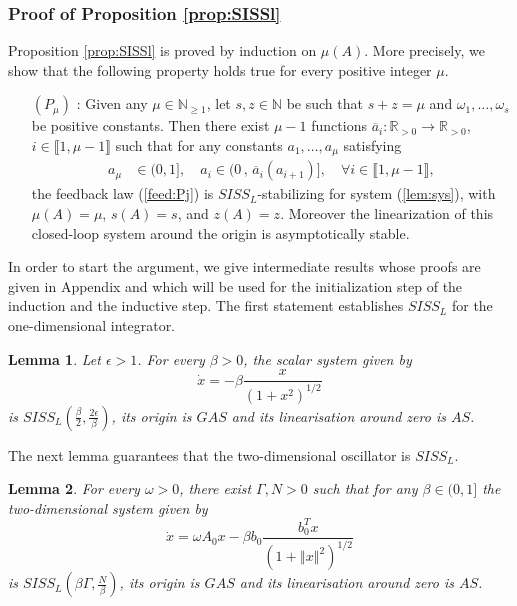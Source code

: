 \documentclass[letterpaper, 10pt]{article}
\newtheorem{lem}{Lemma}
\newcommand{\rref}[1]{(\ref{#1})}
\newcommand{\norme}[1]{\left\Vert #1\right\Vert}
\newcommand{\reels}{\mathbb{R}}
\newcommand{\entiers}{\mathbb{N}}
\begin{document}
\subsubsection{Proof of Proposition \ref{prop:SISSl}}\label{sec:proofprop1}
Proposition \ref{prop:SISSl} is proved by induction on $\mu(A)$. More precisely, we show that the following property holds true for every positive integer $\mu$.
\begin{itemize}
\item[$(P_\mu)$ : ] Given any $\mu \in \entiers_{\geq 1}$, let $s,z \in \entiers $ be such that $s + z = \mu $ and $\omega_1, \ldots , \omega_s$ be positive constants. Then there exist $\mu -1 $ functions $\overline{a}_i : \reels_{>0} \rightarrow \reels_{>0}$, $i \in \llbracket 1 ,\mu -1 \rrbracket$ such that for any constants $a_1 , \ldots , a_\mu $ satisfying
\begin{align*}
  a_{\mu} &\in (0, 1], \quad a_i \in (0\,,\, \overline{a}_i (a_{i+1})] , \quad \forall i  \in \llbracket 1 ,\mu -1 \rrbracket,
\end{align*} 
the feedback law \rref{feed:Pj} is $SISS_L$-stabilizing for system \rref{lem:sys}, with $\mu(A) = \mu$, $s(A) =s$, and $z(A)=z$. Moreover the linearization of this closed-loop system around the origin is asymptotically stable.
\end{itemize}
In order to start the argument, we give intermediate results whose proofs are given in Appendix
and which will be used for the initialization step of the induction and the inductive step. The first statement establishes $SISS_L$ for the one-dimensional integrator.
\begin{lem}
\label{lem:SISS:int}
Let $\epsilon > 1$. For every $\beta >0 $, the scalar system given by
\begin{equation}
\label{sys_int_pert_2}
\dot{x} = - \beta \frac{x} {(1+ x^2)^{1/2}}
\end{equation}
is  $ SISS_L (  \frac{\beta}{2} , \frac{ 2 \epsilon }{ \beta } )$, its origin is $GAS$ and its linearisation around zero is $AS$. 
 \end{lem}
The next lemma guarantees that the two-dimensional oscillator is $SISS_L$.
\begin{lem}
\label{Lem:osci}
For every $\omega>0$,  there exist $\Gamma ,N >0$ such that for any $\beta \in (0,1]$ the two-dimensional system given by
\begin{equation}
\label{sys_osc;cor}
\dot{x}= \omega A_0 x - \beta  b_0 \frac{b_0^T x}{(1+ \norme{x}^2)^{1/2}}
\end{equation} 
is $SISS_L(  \beta \Gamma   , \frac{N}{\beta} ) $, its origin is $GAS$ and its linearisation around zero is $AS$. 
\end{lem}
\end{document}
